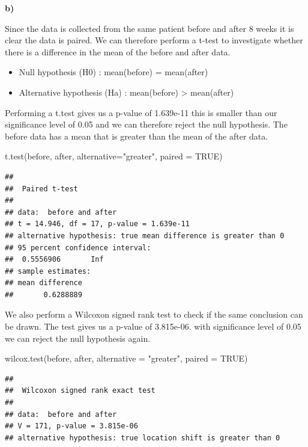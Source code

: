 \documentclass[
]{article}
\newenvironment{Shaded}{\begin{snugshade}}{\end{snugshade}}
\newcommand{\AttributeTok}[1]{\textcolor[rgb]{0.77,0.63,0.00}{#1}}
\newcommand{\ConstantTok}[1]{\textcolor[rgb]{0.00,0.00,0.00}{#1}}
\newcommand{\FunctionTok}[1]{\textcolor[rgb]{0.00,0.00,0.00}{#1}}
\newcommand{\NormalTok}[1]{#1}
\newcommand{\StringTok}[1]{\textcolor[rgb]{0.31,0.60,0.02}{#1}}
\providecommand{\tightlist}{%
  \setlength{\itemsep}{0pt}\setlength{\parskip}{0pt}}
\begin{document}
\textbf{b)}

Since the data is collected from the same patient before and after 8
weeks it is clear the data is paired. We can therefore perform a t-test
to investigate whether there is a difference in the mean of the before
and after data.

\begin{itemize}
\tightlist
\item
  Null hypothesis (H0) : mean(before) = mean(after)
\item
  Alternative hypothesis (Ha) : mean(before) \textgreater{} mean(after)
\end{itemize}

Performing a t.test gives us a p-value of 1.639e-11 this is smaller than
our significance level of 0.05 and we can therefore reject the null
hypothesis. The before data has a mean that is greater than the mean of
the after data.

\begin{Shaded}
\begin{Highlighting}[]
\FunctionTok{t.test}\NormalTok{(before, after, }\AttributeTok{alternative=}\StringTok{"greater"}\NormalTok{, }\AttributeTok{paired =} \ConstantTok{TRUE}\NormalTok{)}
\end{Highlighting}
\end{Shaded}

\begin{verbatim}
## 
##  Paired t-test
## 
## data:  before and after
## t = 14.946, df = 17, p-value = 1.639e-11
## alternative hypothesis: true mean difference is greater than 0
## 95 percent confidence interval:
##  0.5556906       Inf
## sample estimates:
## mean difference 
##       0.6288889
\end{verbatim}

We also perform a Wilcoxon signed rank test to check if the same
conclusion can be drawn. The test gives us a p-value of 3.815e-06. with
significance level of 0.05 we can reject the null hypothesis again.

\begin{Shaded}
\begin{Highlighting}[]
\FunctionTok{wilcox.test}\NormalTok{(before, after, }\AttributeTok{alternative =} \StringTok{"greater"}\NormalTok{, }\AttributeTok{paired =} \ConstantTok{TRUE}\NormalTok{)}
\end{Highlighting}
\end{Shaded}

\begin{verbatim}
## 
##  Wilcoxon signed rank exact test
## 
## data:  before and after
## V = 171, p-value = 3.815e-06
## alternative hypothesis: true location shift is greater than 0
\end{verbatim}
\end{document}
